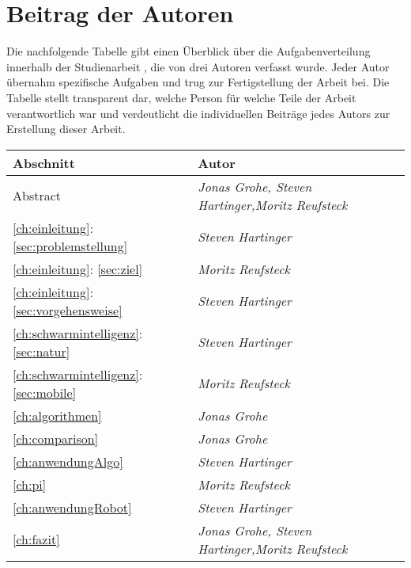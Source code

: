 \section*{Beitrag der Autoren}
Die nachfolgende Tabelle gibt einen Überblick über die Aufgabenverteilung innerhalb der Studienarbeit \textit{\thetitle}, die von drei Autoren verfasst wurde. Jeder Autor übernahm spezifische Aufgaben und trug zur Fertigstellung der Arbeit bei. Die Tabelle stellt transparent dar, welche Person für welche Teile der Arbeit verantwortlich war und verdeutlicht die individuellen Beiträge jedes Autors zur Erstellung dieser Arbeit.
\vspace*{1cm}

\begin{table}[H]
    \renewcommand{\arraystretch}{1.2}
    \begin{tabularx}{\textwidth}{|X|X|}
        \hline
        \textbf{Abschnitt} & \textbf{Autor} \\
        \hline
        Abstract & \textit{Jonas Grohe, Steven Hartinger,\newline Moritz Reufsteck} \\
        \hline
        \autoref{ch:einleitung}: \autoref{sec:problemstellung} & \textit{Steven Hartinger} \\
        \hline
        \autoref{ch:einleitung}: \autoref{sec:ziel} & \textit{Moritz Reufsteck} \\
        \hline
        \autoref{ch:einleitung}: \autoref{sec:vorgehensweise} & \textit{Steven Hartinger} \\
        \hline
        \autoref{ch:schwarmintelligenz}: \autoref{sec:natur} & \textit{Steven Hartinger} \\
        \hline 
        \autoref{ch:schwarmintelligenz}: \autoref{sec:mobile} & \textit{Moritz Reufsteck} \\
        \hline
        \autoref{ch:algorithmen} & \textit{Jonas Grohe} \\
        \hline
        \autoref{ch:comparison} & \textit{Jonas Grohe} \\
        \hline
        \autoref{ch:anwendungAlgo} & \textit{Steven Hartinger} \\
        \hline
        \autoref{ch:pi} & \textit{Moritz Reufsteck} \\
        \hline
        \autoref{ch:anwendungRobot} & \textit{Steven Hartinger} \\
        \hline
        \autoref{ch:fazit} & \textit{Jonas Grohe, Steven Hartinger,\newline Moritz Reufsteck} \\
        \hline
    \end{tabularx}
\end{table}